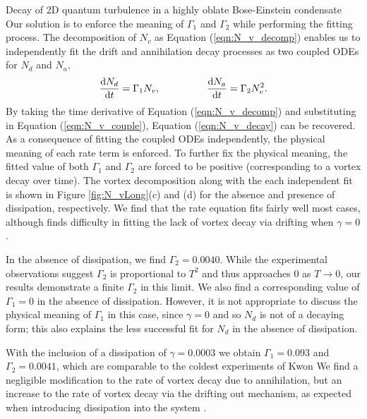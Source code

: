 \begin{chapter}{\label{cha:shin}Decay of 2D quantum turbulence in a highly oblate Bose-Einstein condensate}
Our solution is to enforce the meaning of $\Gamma_1$ and $\Gamma_2$ while performing the fitting process. The decomposition of $N_v$ as Equation (\ref{eqn:N_v_decomp}) enables us to independently fit the drift and annihilation decay processes as two coupled ODEs for $N_d$ and $N_a$,
\begin{equation}
  \frac{{\rm d}N_d}{{\rm d}t} = \Gamma_1 N_v,~~~~~~~~~~~~~~
  \frac{{\rm d}N_a}{{\rm d}t} = \Gamma_2 N_v^2.
\label{eqn:N_v_couple}
\end{equation}
By taking the time derivative of Equation (\ref{eqn:N_v_decomp}) and substituting in Equation (\ref{eqn:N_v_couple}), Equation (\ref{eqn:N_v_decay}) can be recovered. As a consequence of fitting the coupled ODEs independently, the physical meaning of each rate term is enforced. To further fix the physical meaning, the fitted value of both $\Gamma_1$ and $\Gamma_2$ are forced to be positive (corresponding to a vortex decay over time). The vortex decomposition along with the each independent fit is shown in Figure \ref{fig:N_vLong}(c) and (d) for the absence and presence of dissipation, respectively. We find that the rate equation fits fairly well most cases, although finds difficulty in fitting the lack of vortex decay via drifting when $\gamma=0$.

In the absence of dissipation, we find $\Gamma_{2} = 0.0040$. While the experimental observations \cite{kwon_moon_14} suggest $\Gamma_2$ is proportional to $T^2$ and thus approaches 0 as $T\rightarrow0$, our results demonstrate a finite $\Gamma_2$ in this limit. We also find a corresponding value of $\Gamma_{1} = 0$ in the absence of dissipation. However, it is not appropriate to discuss the physical meaning of $\Gamma_1$ in this case, since $\gamma=0$ and so $N_d$ is not of a decaying form; this also explains the less successful fit for $N_d$ in the absence of dissipation.

With the inclusion of a dissipation of $\gamma=0.0003$ we obtain $\Gamma_{1} = 0.093$ and $\Gamma_{2} = 0.0041$, which are comparable to the coldest experiments of Kwon \etal We find a negligible modification to the rate of vortex decay due to annihilation, but an increase to the rate of vortex decay via the drifting out mechanism, as expected when introducing dissipation into the system \citep{allen_zaremba_13}.


\end{chapter}
